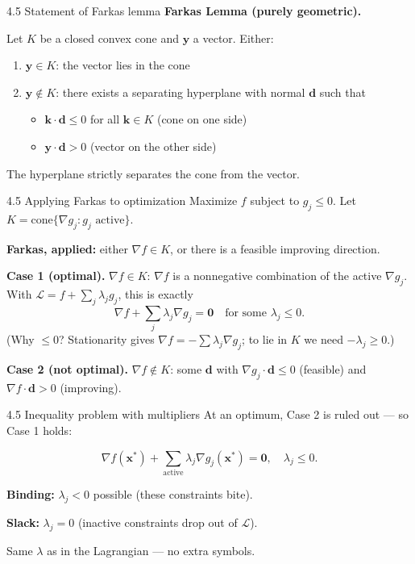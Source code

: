 \documentclass[11pt,aspectratio=169]{beamer}
\begin{document}
\begin{frame}{4.5 Statement of Farkas lemma}
  \small
  \textbf{Farkas Lemma (purely geometric).}
  
  Let $K$ be a closed convex cone and $\mathbf{y}$ a vector. Either:
  
  \begin{enumerate}
    \item $\mathbf{y} \in K$: the vector lies in the cone
    
    \item $\mathbf{y} \notin K$: there exists a separating hyperplane with normal $\mathbf{d}$ such that
    
    \begin{itemize}
      \item $\mathbf{k} \cdot \mathbf{d} \leq 0$ for all $\mathbf{k} \in K$ (cone on one side)
      
      \item $\mathbf{y} \cdot \mathbf{d} > 0$ (vector on the other side)
    \end{itemize}
  \end{enumerate}
  
  The hyperplane strictly separates the cone from the vector.
\end{frame}

\begin{frame}{4.5 Applying Farkas to optimization}
  \small
  Maximize $f$ subject to $g_j\leq 0$. Let $K=\mathrm{cone}\{\nabla g_j:g_j\text{ active}\}$.
  
  \textbf{Farkas, applied:} either $\nabla f\in K$, or there is a feasible improving direction.
  
  \textbf{Case 1 (optimal).} $\nabla f\in K$: $\nabla f$ is a nonnegative combination of the active $\nabla g_j$.
  With $\mathcal{L}=f+\sum_j\lambda_j g_j$, this is exactly
  \[
    \nabla f+\sum_j\lambda_j\nabla g_j=\mathbf{0}\quad\text{for some }\lambda_j\leq 0.
  \]
  (Why $\leq 0$? Stationarity gives $\nabla f=-\sum\lambda_j\nabla g_j$; to lie in $K$ we need $-\lambda_j\geq 0$.)
  
  \textbf{Case 2 (not optimal).} $\nabla f\notin K$: some $\mathbf{d}$ with $\nabla g_j\cdot\mathbf{d}\leq 0$ (feasible) and $\nabla f\cdot\mathbf{d}>0$ (improving).
\end{frame}

\begin{frame}{4.5 Inequality problem with multipliers}
  \small
  At an optimum, Case 2 is ruled out --- so Case 1 holds:
  
  \[
    \nabla f(\mathbf{x}^*) + \sum_{\text{active}} \lambda_j \nabla g_j(\mathbf{x}^*) = \mathbf{0}, \quad \lambda_j \leq 0.
  \]
  
  \textbf{Binding:} $\lambda_j<0$ possible (these constraints bite).
  
  \textbf{Slack:} $\lambda_j=0$ (inactive constraints drop out of $\mathcal{L}$).
  
  Same $\lambda$ as in the Lagrangian --- no extra symbols.
\end{frame}
\end{document}
